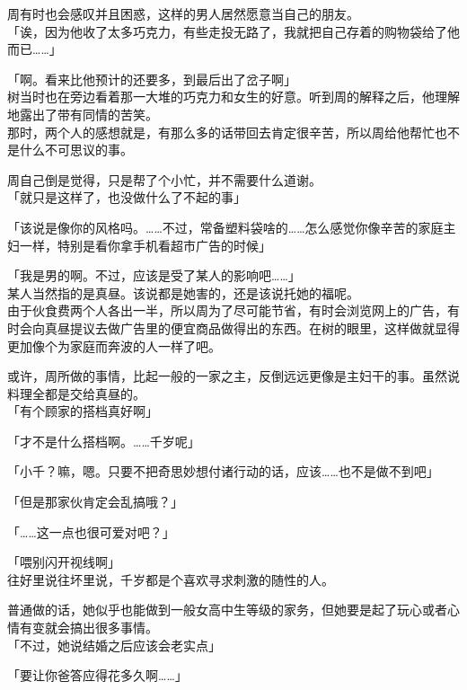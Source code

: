 周有时也会感叹并且困惑，这样的男人居然愿意当自己的朋友。\\

「诶，因为他收了太多巧克力，有些走投无路了，我就把自己存着的购物袋给了他而已……」

「啊。看来比他预计的还要多，到最后出了岔子啊」\\

树当时也在旁边看着那一大堆的巧克力和女生的好意。听到周的解释之后，他理解地露出了带有同情的苦笑。\\

那时，两个人的感想就是，有那么多的话带回去肯定很辛苦，所以周给他帮忙也不是什么不可思议的事。

周自己倒是觉得，只是帮了个小忙，并不需要什么道谢。\\

「就只是这样了，也没做什么了不起的事」

「该说是像你的风格吗。……不过，常备塑料袋啥的……怎么感觉你像辛苦的家庭主妇一样，特别是看你拿手机看超市广告的时候」

「我是男的啊。不过，应该是受了某人的影响吧……」\\

某人当然指的是真昼。该说都是她害的，还是该说托她的福呢。\\

由于伙食费两个人各出一半，所以周为了尽可能节省，有时会浏览网上的广告，有时会向真昼提议去做广告里的便宜商品做得出的东西。在树的眼里，这样做就显得更加像个为家庭而奔波的人一样了吧。

或许，周所做的事情，比起一般的一家之主，反倒远远更像是主妇干的事。虽然说料理全都是交给真昼的。\\

「有个顾家的搭档真好啊」

「才不是什么搭档啊。……千岁呢」

「小千？嘛，嗯。只要不把奇思妙想付诸行动的话，应该……也不是做不到吧」

「但是那家伙肯定会乱搞哦？」

「……这一点也很可爱对吧？」

「喂别闪开视线啊」\\

往好里说往坏里说，千岁都是个喜欢寻求刺激的随性的人。

普通做的话，她似乎也能做到一般女高中生等级的家务，但她要是起了玩心或者心情有变就会搞出很多事情。\\

「不过，她说结婚之后应该会老实点」

「要让你爸答应得花多久啊……」\\


